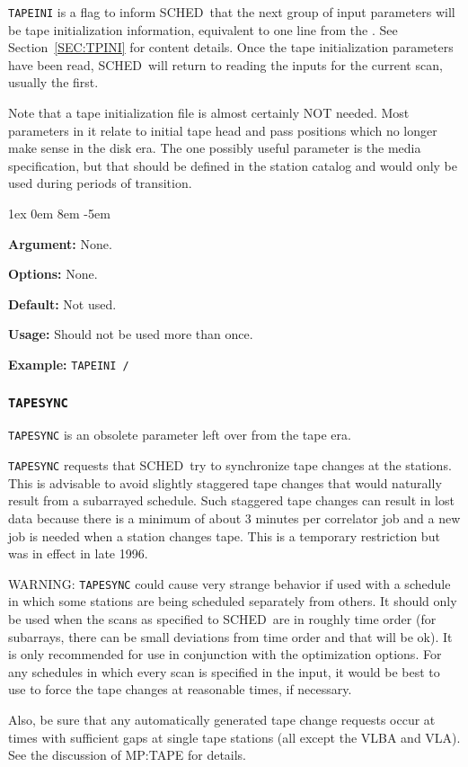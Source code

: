 \documentclass{report}
\newcommand{\schedb}{{\sc SCHED~}}
\newcommand{\rcwbox}[5]{
  \begin{list}{}{\parsep 1ex  \itemsep 0em
                 \leftmargin 8em  \itemindent -5em }
    \item {\bf Argument:} #1
    \item {\bf Options:}  #2
    \item {\bf Default:}  #3
    \item {\bf Usage:}    #4
    \item {\bf Example:}  #5
  \end{list}
}
\begin{document}
{\tt TAPEINI} is a flag to inform \schedb that the next group
of input parameters will be tape initialization information,
equivalent to one line from the .
See Section~\ref{SEC:TPINI} for content details.  Once the tape
initialization parameters have been read, \schedb will return
to reading the inputs for the current scan, usually the first.

Note that a tape initialization file is almost certainly NOT needed.
Most parameters in it relate to initial tape head and pass positions
which no longer make sense in the disk era.  The one possibly useful
parameter is the media specification, but that should be defined in
the station catalog and would only be used during periods of transition.

\rcwbox
{None.}
{None.}
{Not used.}
{Should not be used more than once.}
{{\tt TAPEINI /}}


\subsubsection{\label{MP:TAPESYNC}{\tt TAPESYNC}}

{\tt TAPESYNC} is an obsolete parameter left over from the tape era.

{\tt TAPESYNC} requests that \schedb try to synchronize tape changes
at the stations.  This is advisable to avoid slightly staggered tape
changes that would naturally result from a subarrayed schedule.
Such staggered tape changes can result in lost data because there
is a minimum of about 3 minutes per correlator job and a new job
is needed when a station changes tape.  This is a temporary
restriction but was in effect in late 1996.

WARNING:  {\tt TAPESYNC} could cause very strange behavior if used
with a schedule in which some stations are being scheduled separately
from others.  It should only be used when the scans as specified to
\schedb are in roughly time order (for subarrays, there can be
small deviations from time order and that will be ok).  It is only
recommended for use in conjunction with the optimization options.
For any schedules in which every scan is specified in the input, it
would be best to use  to force the
tape changes at reasonable times, if necessary.

Also, be sure that any automatically generated tape change requests
occur at times with sufficient gaps at single tape stations (all
except the VLBA and VLA).  See the discussion of 
{MP:TAPE} for details.
\end{document}
